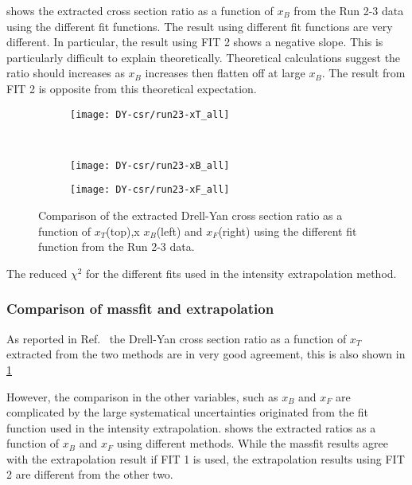 \documentclass[../main.tex]{subfiles}
\begin{document}
 shows the extracted cross section ratio as a function of $x_B$
from the Run 2-3 data using the different fit functions. The result using different fit 
functions are very different. In particular, the result using FIT 2 shows a negative slope.
This is particularly difficult to explain theoretically. Theoretical calculations suggest the
ratio should increases as $x_B$ increases then flatten off at large $x_B$. The result from
FIT 2 is opposite from this theoretical expectation.
\begin{figure}[h!]
	\centering
	\begin{subfigure}{0.6\linewidth}
		\texttt{[image: DY-csr/run23-xT\_all]}
	\end{subfigure}\\
	\begin{subfigure}{0.45\linewidth}
		\texttt{[image: DY-csr/run23-xB\_all]}
	\end{subfigure}
	\begin{subfigure}{0.45\linewidth}
		\texttt{[image: DY-csr/run23-xF\_all]}
	\end{subfigure}
	\caption{Comparison of the extracted Drell-Yan cross section ratio as a function of $x_T$(top),x
		$x_B$(left) and $x_F$(right) using the different fit function from the Run 2-3
		 data.}
	\label{fig:CSR_Run2-3}
\end{figure}

\begin{table}
\centering
\caption{The reduced $\chi^2$ for the different fits used in the intensity extrapolation method. }

\end{table}


\subsubsection{Comparison of massfit and extrapolation}
As reported in Ref.~\cite{dove2023} the Drell-Yan cross section ratio as a function of $x_T$ extracted from
the two methods are in very good agreement, this is also shown in \cref{fig:CSR_Run2-3}

However, the comparison in the other variables, such as $x_B$ and $x_F$ are complicated by the large
systematical uncertainties originated from the fit function used in the intensity extrapolation.
 shows the extracted ratios as a function of $x_B$ and $x_F$ using different methods.
While the massfit results agree with the extrapolation result if FIT 1 is used, the 
extrapolation results using FIT 2 are different from the other two.
\end{document}
